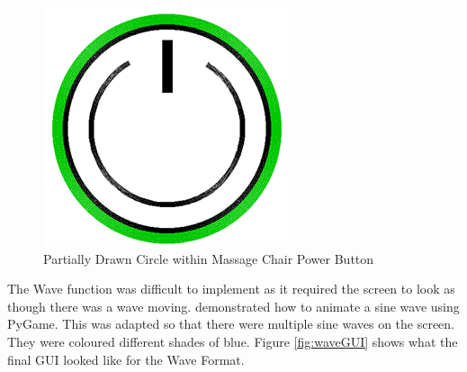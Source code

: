 \documentclass{l4proj}
\begin{document}
\begin{figure}[!htb]
    \centering
    \includegraphics[scale = 0.5]{images/powerButton.png}
    \caption{Partially Drawn Circle within Massage Chair Power Button}
    \label{fig:powerButton}
\end{figure}

The Wave function was difficult to implement as it required the screen to look as though there was a wave moving. \cite{Eastwood_2015} demonstrated how to animate a sine wave using PyGame. This was adapted so that there were multiple sine waves on the screen. They were coloured different shades of blue. Figure \ref{fig:waveGUI} shows what the final GUI looked like for the Wave Format.
\end{document}
